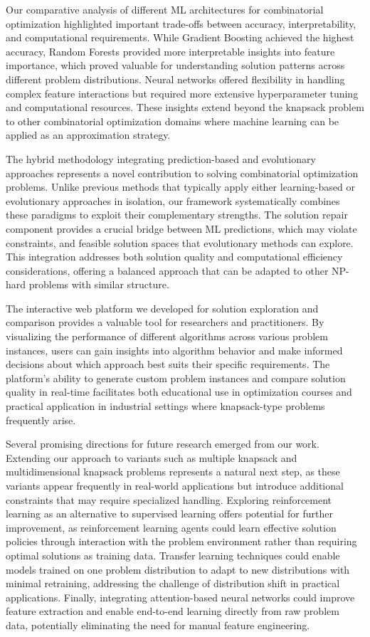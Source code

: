 \documentclass[conference, a4paper]{IEEEtran}
\begin{document}
Our comparative analysis of different ML architectures for combinatorial optimization highlighted important trade-offs between accuracy, interpretability, and computational requirements. While Gradient Boosting achieved the highest accuracy, Random Forests provided more interpretable insights into feature importance, which proved valuable for understanding solution patterns across different problem distributions. Neural networks offered flexibility in handling complex feature interactions but required more extensive hyperparameter tuning and computational resources. These insights extend beyond the knapsack problem to other combinatorial optimization domains where machine learning can be applied as an approximation strategy.

The hybrid methodology integrating prediction-based and evolutionary approaches represents a novel contribution to solving combinatorial optimization problems. Unlike previous methods that typically apply either learning-based or evolutionary approaches in isolation, our framework systematically combines these paradigms to exploit their complementary strengths. The solution repair component provides a crucial bridge between ML predictions, which may violate constraints, and feasible solution spaces that evolutionary methods can explore. This integration addresses both solution quality and computational efficiency considerations, offering a balanced approach that can be adapted to other NP-hard problems with similar structure.

The interactive web platform we developed for solution exploration and comparison provides a valuable tool for researchers and practitioners. By visualizing the performance of different algorithms across various problem instances, users can gain insights into algorithm behavior and make informed decisions about which approach best suits their specific requirements. The platform's ability to generate custom problem instances and compare solution quality in real-time facilitates both educational use in optimization courses and practical application in industrial settings where knapsack-type problems frequently arise.

Several promising directions for future research emerged from our work. Extending our approach to variants such as multiple knapsack and multidimensional knapsack problems represents a natural next step, as these variants appear frequently in real-world applications but introduce additional constraints that may require specialized handling. Exploring reinforcement learning as an alternative to supervised learning offers potential for further improvement, as reinforcement learning agents could learn effective solution policies through interaction with the problem environment rather than requiring optimal solutions as training data. Transfer learning techniques could enable models trained on one problem distribution to adapt to new distributions with minimal retraining, addressing the challenge of distribution shift in practical applications. Finally, integrating attention-based neural networks could improve feature extraction and enable end-to-end learning directly from raw problem data, potentially eliminating the need for manual feature engineering.
\end{document}
